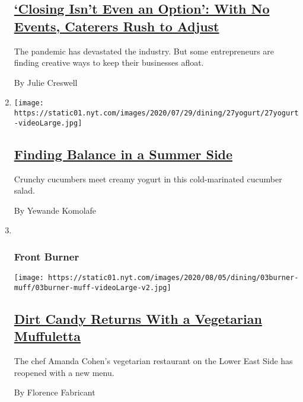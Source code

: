 \begin{enumerate}
{  \subsection{\texorpdfstring{\href{/2020/08/04/business/coronavirus-struggling-caterers.html}{`Closing
  Isn't Even an Option': With No Events, Caterers Rush to
  Adjust}}{`Closing Isn't Even an Option': With No Events, Caterers Rush to Adjust}}\label{closing-isnt-even-an-option-with-no-events-caterers-rush-to-adjust}}

  The pandemic has devastated the industry. But some entrepreneurs are
  finding creative ways to keep their businesses afloat.

  By Julie Creswell
\item
  \texttt{[image: https://static01.nyt.com/images/2020/07/29/dining/27yogurt/27yogurt-videoLarge.jpg]}

  \hypertarget{finding-balance-in-a-summer-side}{%
  \subsection{\texorpdfstring{\href{/2020/07/27/dining/cucumbers-yogurt-recipe.html}{Finding
  Balance in a Summer
  Side}}{Finding Balance in a Summer Side}}\label{finding-balance-in-a-summer-side}}

  Crunchy cucumbers meet creamy yogurt in this cold-marinated cucumber
  salad.

  By Yewande Komolafe
\item ~
  \hypertarget{front-burner}{%
  \subsubsection{Front Burner}\label{front-burner}}

  \texttt{[image: https://static01.nyt.com/images/2020/08/05/dining/03burner-muff/03burner-muff-videoLarge-v2.jpg]}

  \hypertarget{dirt-candy-returns-with-a-vegetarian-muffuletta}{%
  \subsection{\texorpdfstring{\href{/2020/08/03/dining/dirt-candy-vegetarian-muffuletta.html}{Dirt
  Candy Returns With a Vegetarian
  Muffuletta}}{Dirt Candy Returns With a Vegetarian Muffuletta}}\label{dirt-candy-returns-with-a-vegetarian-muffuletta}}

  The chef Amanda Cohen's vegetarian restaurant on the Lower East Side
  has reopened with a new menu.

  By Florence Fabricant
\end{enumerate}

